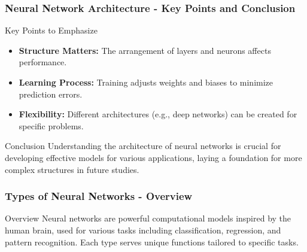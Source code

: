 \documentclass[aspectratio=169]{beamer}
\begin{document}
\begin{frame}[fragile]
    \frametitle{Neural Network Architecture - Key Points and Conclusion}
    \begin{block}{Key Points to Emphasize}
        \begin{itemize}
            \item \textbf{Structure Matters:} The arrangement of layers and neurons affects performance.
            \item \textbf{Learning Process:} Training adjusts weights and biases to minimize prediction errors.
            \item \textbf{Flexibility:} Different architectures (e.g., deep networks) can be created for specific problems.
        \end{itemize}
    \end{block}
    
    \begin{block}{Conclusion}
        Understanding the architecture of neural networks is crucial for developing effective models for various applications, laying a foundation for more complex structures in future studies.
    \end{block}
\end{frame}

\begin{frame}[fragile]
    \frametitle{Types of Neural Networks - Overview}
    \begin{block}{Overview}
        Neural networks are powerful computational models inspired by the human brain, used for various tasks including classification, regression, and pattern recognition. Each type serves unique functions tailored to specific tasks.
    \end{block}
\end{frame}
\end{document}
